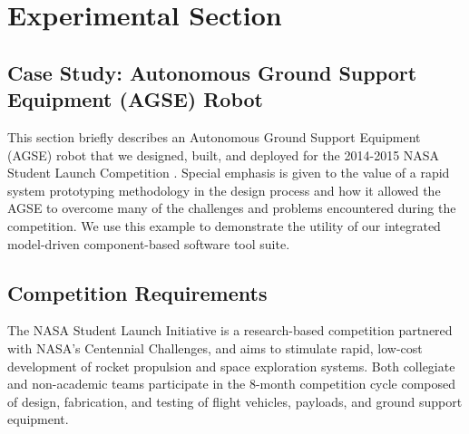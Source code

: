 

\section{Experimental Section}

\subsection{Case Study: Autonomous Ground Support Equipment (AGSE) Robot}

This section briefly describes an Autonomous Ground Support Equipment
(AGSE) robot that we designed, built, and deployed for the 2014-2015
NASA Student Launch Competition \cite{NASA_SL}. Special emphasis is
given to the value of a rapid system prototyping methodology in the
design process and how it allowed the AGSE to overcome many of the
challenges and problems encountered during the competition.  We use
this example to demonstrate the utility of our integrated model-driven
component-based software tool suite.

\subsection{Competition Requirements}

The NASA Student Launch Initiative \cite{NASA_SL} is a research-based
competition partnered with NASA's Centennial Challenges, and aims to
stimulate rapid, low-cost development of rocket propulsion and space
exploration systems.  Both collegiate and non-academic teams
participate in the 8-month competition cycle composed of design,
fabrication, and testing of flight vehicles, payloads, and ground
support equipment.

